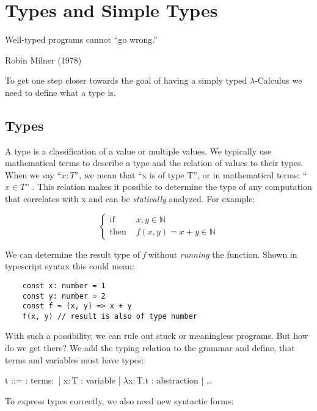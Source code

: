 \section{Types and Simple Types}

\epigraph{Well-typed programs cannot ``go wrong.''}{Robin Milner (1978)}

To get one step closer towards the goal of having a
simply typed $\lambda$-Calculus we need to define
what a type is.

\subsection{Types}

A type is a classification of a value or multiple values.
We typically use mathematical terms to describe a type and the relation
of values to their types. When we say ``$x : T$'', we mean that
``x is of type T'', or in mathematical terms: ``$x \in T$'' \cite{pierce2002ProgLang}.
This relation makes it possible to determine the type of any computation
that correlates with x and can be \textit{statically} analyzed.
For example:

\begin{equation*}
    \begin{cases}
        \text{if }   & x,y \in \mathbb{N}            \\
        \text{then } & f(x,y) = x + y \in \mathbb{N}
    \end{cases}
\end{equation*}

We can determine the result type of \textit{f} without
\textit{running} the function. Shown in typescript syntax this could mean:

\begin{verbatim}
    const x: number = 1
    const y: number = 2
    const f = (x, y) => x + y
    f(x, y) // result is also of type number
\end{verbatim}

With such a possibility, we can rule out stuck or meaningless programs.
But how do we get there? We add the typing relation to
the grammar and define, that terms and variables must have types:

\begin{bnfgrammar}
    t ::= : terms$\colon$
    | x$\colon$T : variable
    | $\lambda$x$\colon$T.t : abstraction
    | \dots
\end{bnfgrammar}

To express types correctly, we also need new syntactic forms:

